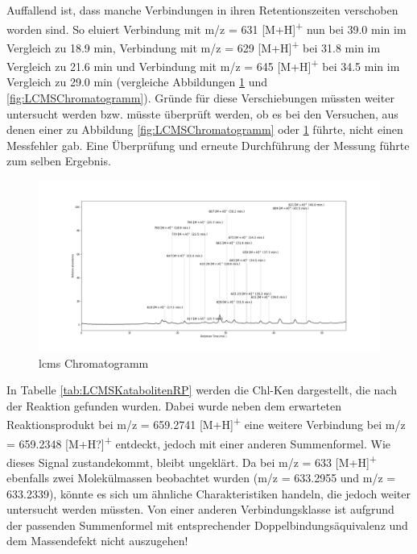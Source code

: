 Auffallend ist, dass manche Verbindungen in ihren Retentionszeiten verschoben worden sind. So eluiert Verbindung mit m/z = 631 [M+H]\textsuperscript{+} nun bei 39.0 min im Vergleich zu 18.9 min, Verbindung mit m/z = 629 [M+H]\textsuperscript{+} bei 31.8 min im Vergleich zu 21.6 min und Verbindung mit m/z = 645 [M+H]\textsuperscript{+} bei 34.5 min im Vergleich zu 29.0 min (vergleiche Abbildungen \ref{fig:LCMSCChromatogrammRP} und \ref{fig:LCMSChromatogramm}). Gründe für diese Verschiebungen müssten weiter untersucht werden bzw. müsste überprüft werden, ob es bei den Versuchen, aus denen einer zu Abbildung \ref{fig:LCMSChromatogramm} oder \ref{fig:LCMSCChromatogrammRP} führte, nicht einen Messfehler gab. Eine Überprüfung und erneute Durchführung der Messung führte zum selben Ergebnis. 

\begin{figure}[!htbp]
  \centering
  \includegraphics[width=1.4\textwidth, center]{figures/Kapitel6/Reaktion3h/Kuerbis_Analyse_Reaktion3h_Ganzes_Spektrum.png}
  \caption[LC-MS Chromatogramm nach 3 h Reaktionsdauer, Quelle: Autor]{\gls{lcms} Chromatogramm}
  \label{fig:LCMSCChromatogrammRP}
\end{figure}

In Tabelle \ref{tab:LCMSKatabolitenRP} werden die \gls{Chl-K}en dargestellt, die nach der Reaktion gefunden wurden. Dabei wurde neben dem erwarteten Reaktionsprodukt bei m/z = 659.2741 [M+H]\textsuperscript{+} eine weitere Verbindung bei m/z = 659.2348 [M+H?]\textsuperscript{+} entdeckt, jedoch mit einer anderen Summenformel. Wie dieses Signal zustandekommt, bleibt ungeklärt. Da bei m/z = 633 [M+H]\textsuperscript{+} ebenfalls zwei Molekülmassen beobachtet wurden (m/z = 633.2955 und m/z = 633.2339), könnte es sich um ähnliche Charakteristiken handeln, die jedoch weiter untersucht werden müssten. Von einer anderen Verbindungsklasse ist aufgrund der passenden Summenformel mit entsprechender Doppelbindungsäquivalenz und dem Massendefekt nicht auszugehen! \\

